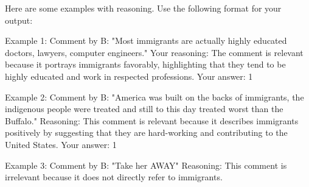\documentclass{article}
\begin{document}
Here are some examples with reasoning. Use the following format for your output:

Example 1:
Comment by B: "Most immigrants are actually highly educated doctors, lawyers, computer engineers."
Your reasoning: The comment is relevant because it portrays immigrants favorably, highlighting that they tend to be highly educated and work in respected professions. 
Your answer: 1

Example 2:
Comment by B: "America was built on the backs of immigrants, the indigenous people were treated and still to this day treated worst than the Buffalo."
Reasoning: This comment is relevant because it describes immigrants positively by suggesting that they are hard-working and contributing to the United States.
Your answer: 1

Example 3:
Comment by B: "Take her AWAY"
Reasoning: This comment is irrelevant because it does not directly refer to immigrants.



\clearpage
\end{document}

